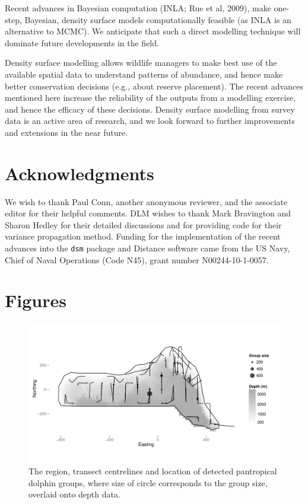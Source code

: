\documentclass[a4paper,12pt]{article}
\begin{document}
Recent advances in Bayesian computation (INLA; Rue et al, 2009), make one-step, Bayesian, density surface models computationally feasible (as INLA is an alternative to MCMC). We anticipate that such a direct modelling technique will dominate future developments in the field.

Density surface modelling allows wildlife managers to make best use of the available spatial data to understand patterns of abundance, and hence make better conservation decisions (e.g., about reserve placement). The recent advances mentioned here increase the reliability of the outputs from a modelling exercise, and hence the efficacy of these decisions.  Density surface modelling from survey data is an active area of research, and we look forward to further improvements and extensions in the near future.

\section*{Acknowledgments}

We wish to thank Paul Conn, another anonymous reviewer, and the associate editor for their helpful comments. DLM wishes to thank Mark Bravington and Sharon Hedley for their detailed discussions and for providing code for their variance propagation method. Funding for the implementation of the recent advances into the \texttt{dsm} package and Distance software came from the US Navy, Chief of Naval Operations (Code N45), grant number N00244-10-1-0057.

\newpage




\newpage


\newpage


\section*{Figures}

\begin{figure}[h!]
  \caption{The region, transect centrelines and location of detected pantropical dolphin groups, where size of circle corresponds to the group size, overlaid onto depth data.}
  \label{dolphin-eda}
  \begin{center}
    \includegraphics[width=\textwidth]{depth-transects}
  \end{center}
\end{figure}
\end{document}
